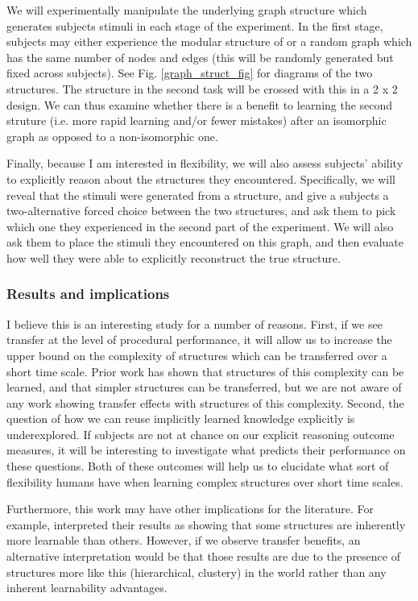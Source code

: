 \documentclass[11pt]{article}
\begin{document}
We will experimentally manipulate the underlying graph structure which generates subjects stimuli in each stage of the experiment. In the first stage, subjects may either experience the modular structure of \citep{Schapiro2013} or a random graph which has the same number of nodes and edges (this will be randomly generated but fixed across subjects). See Fig. \ref{graph_struct_fig} for diagrams of the two structures. The structure in the second task will be crossed with this in a 2 x 2 design. We can thus examine whether there is a benefit to learning the second struture (i.e. more rapid learning and/or fewer mistakes) after an isomorphic graph as opposed to a non-isomorphic one.  \par
Finally, because I am interested in flexibility, we will also assess subjects' ability to explicitly reason about the structures they encountered. Specifically, we will reveal that the stimuli were generated from a structure, and give a subjects a two-alternative forced choice between the two structures, and ask them to pick which one they experienced in the second part of the experiment. We will also ask them to place the stimuli they encountered on this graph, and then evaluate how well they were able to explicitly reconstruct the true structure. \par

\subsubsection{Results and implications}
I believe this is an interesting study for a number of reasons. First, if we see transfer at the level of procedural performance, it will allow us to increase the upper bound on the complexity of structures which can be transferred over a short time scale. Prior work has shown that structures of this complexity can be learned, and that simpler structures can be transferred, but we are not aware of any work showing transfer effects with structures of this complexity. Second, the question of how we can reuse implicitly learned knowledge explicitly is underexplored. If subjects are not at chance on our explicit reasoning outcome measures, it will be interesting to investigate what predicts their performance on these questions. Both of these outcomes will help us to elucidate what sort of flexibility humans have when learning complex structures over short time scales. \par 
Furthermore, this work may have other implications for the literature. For example, \citet{Kahn2018} interpreted their results as showing that some structures are inherently more learnable than others. However, if we observe transfer benefits, an alternative interpretation would be that those results are due to the presence of structures more like this (hierarchical, clustery) in the world rather than any inherent learnability advantages. \par
\end{document}
